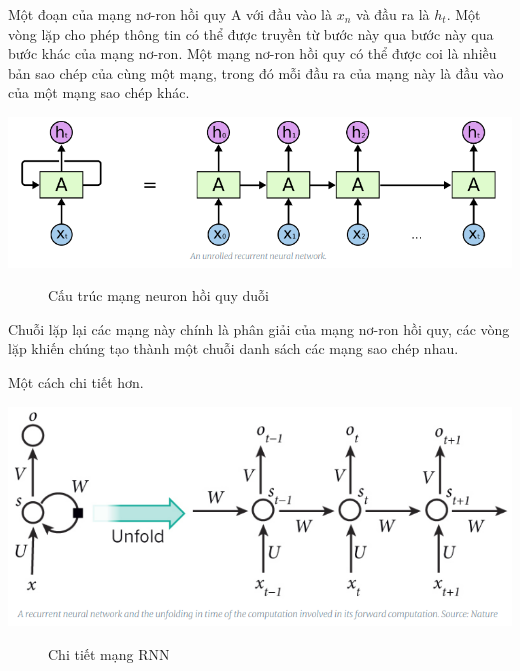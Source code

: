 Một đoạn của mạng nơ-ron hồi quy A với đầu vào là $x_{n}$ và đầu ra là $h_{t}$. Một vòng lặp cho phép thông tin có thể được truyền từ bước này qua bước này qua bước khác của mạng nơ-ron.
Một mạng nơ-ron hồi quy có thể được coi là nhiều bản sao chép của cùng một mạng, trong đó mỗi đầu ra của mạng này là đầu vào của một mạng sao chép khác.\par
\begin{center}
    \includegraphics[scale=.5]{image/chapter6/RNN-ab.png}
    \begin{figure}[htp]
    \begin{center}
    \end{center}
    \caption{Cấu trúc mạng neuron hồi quy duỗi}
    \end{figure}
\end{center}
Chuỗi lặp lại các mạng này chính là phân giải của mạng nơ-ron hồi quy, các vòng lặp khiến chúng tạo thành một chuỗi danh sách các mạng sao chép nhau.\par
Một cách chi tiết hơn. 
\begin{center}
    \includegraphics[scale=.4]{image/chapter6/rnn-detail.png}
    \begin{figure}[htp]
    \begin{center}
     
    \end{center}
    \caption{Chi tiết mạng RNN}
    \end{figure}
\end{center}
